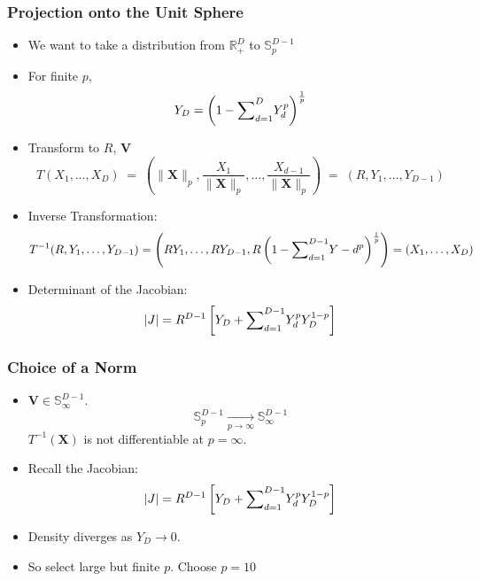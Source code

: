 \documentclass[aspectratio=169,10pt]{beamer}
\begin{document}
\begin{frame}
    \frametitle{Projection onto the Unit Sphere}
    {\footnotesize
    \begin{itemize}
        \item We want to take a distribution from 
            $\mathbb{R}_+^D$ to $\mathbb{S}_p^{D-1}$
        \item For finite $p$,
        \[
            Y_D = \left(1 - {\scriptsize \sum}_{d = 1}^D 
                Y_d^p \right)^{\frac{1}{p}}
        \]
        \item Transform to $R$, $\bm{V}$
        \[
            T(X_1,\ldots,X_D) \;=\; 
                \left(\lVert \bm{X}\rVert_p, \frac{X_1}{\lVert \bm{X}\rVert_p},
                    \ldots, \frac{X_{d-1}}{\lVert \bm{X}\rVert_p}\right) 
                \;=\; (R,Y_1,\ldots,Y_{D-1})
        \]
        \item Inverse Transformation:
        \[
            T^{-1}(R,Y_1,\ldots,Y_{D-1}) = 
                \left(RY_1,\ldots,RY_{D-1},
                    R\left(1 - {\scriptsize \sum}_{d = 1}^{D-1}Y-d^p
                        \right)^{\frac{1}{p}}\right) = (X_1,\ldots,X_D)
        \]
        \item Determinant of the Jacobian:
        \[
            \lvert J\rvert = R^{D-1}\left[Y_D + 
                {\scriptsize \sum}_{d = 1}^{D-1}Y_d^pY_D^{1-p}\right]
        \]
    \end{itemize}
    }
    
    \vfill
    \hyperlink{pgpareto:jacobian}{}
\end{frame} %

\begin{frame}
    \frametitle{Choice of a Norm}
    \begin{itemize}
    \item $\bm{V} \in \mathbb{S}_{\infty}^{D-1}$.
        \[
            \mathbb{S}_p^{D-1} \xrightarrow[p\to\infty]{} 
                \mathbb{S}_{\infty}^{D-1}
        \]
    $T^{-1}(\bm{X})$ is not differentiable at $p = \infty$.\vspace{0.25cm}~
    \item Recall the Jacobian:
        \[
        \lvert J\rvert = R^{D-1}\left[Y_D +
            {\scriptsize \sum}_{d = 1}^{D-1}Y_d^pY_D^{1-p}\right]
        \]
    \item Density diverges as $Y_D\to 0$.
    \item So select large but finite $p$.  Choose $p=10$
    \end{itemize}
\end{frame}
\end{document}
